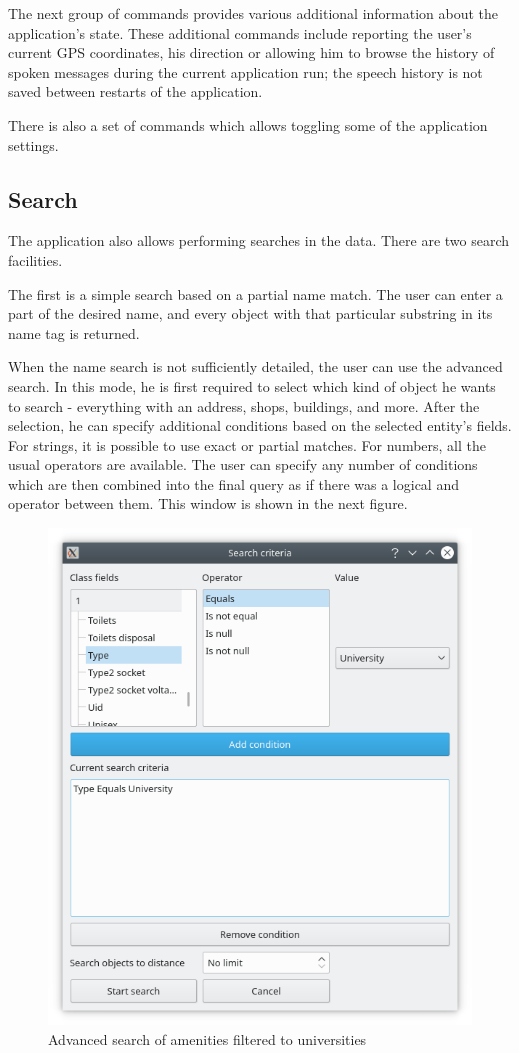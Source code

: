 \documentclass[nolof,digital]{fithesis3}
\begin{document}
The next group of commands provides various additional information about the application's state. These additional commands include reporting the user's current GPS coordinates, his direction or allowing him to browse the history of spoken messages during the current application run; the speech history is not saved between restarts of the application.

There is also a set of commands which allows toggling some of the application settings.
\subsection{Search}
The application also allows performing searches in the data. There are two search facilities.

The first is a simple search based on a partial name match. The user can enter a part of the desired name, and every object with that particular substring in its name tag is returned.

When the name search is not sufficiently detailed, the user can use the advanced search. In this mode, he is first required to select which kind of object he wants to search - everything with an address, shops, buildings, and more. After the selection, he can specify additional conditions based on the selected entity's fields. For strings, it is possible to use exact or partial matches. For numbers, all the usual operators are available. The user can specify any number of conditions which are then combined into the final query as if there was a logical and operator between them. This window is shown in the next figure.
\begin{figure}
\caption{Advanced search of amenities filtered to universities}
\includegraphics{fts-amenity-university}
\end{figure}
\end{document}
